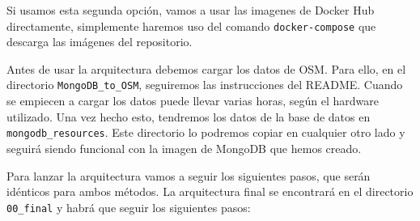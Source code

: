 Si usamos esta segunda opción, 
vamos a usar las imagenes de Docker Hub directamente, 
simplemente haremos uso del comando {\tt docker-compose} que 
descarga las imágenes del repositorio.

Antes de usar la arquitectura debemos cargar los datos de OSM. Para ello,
en el directorio {\tt MongoDB\_to\_OSM}, seguiremos las instrucciones del
README. Cuando se empiecen a cargar los datos puede llevar varias horas,
según el hardware utilizado. Una vez hecho esto, tendremos los datos de la
base de datos en {\tt mongodb\_resources}. Este directorio lo podremos
copiar en cualquier otro lado y seguirá siendo funcional con la imagen de
MongoDB que hemos creado.

Para lanzar la arquitectura vamos a seguir los siguientes pasos, que serán
idénticos para ambos métodos. La arquitectura final se encontrará en el
directorio {\tt 00\_final} y habrá que seguir los siguientes pasos:

